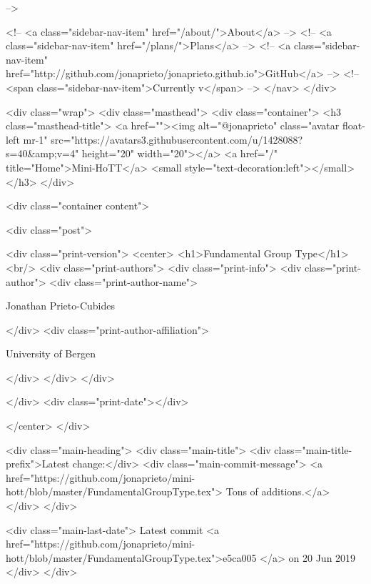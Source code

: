       
     -->

    <!-- <a class="sidebar-nav-item" href="/about/">About</a> -->
    <!-- <a class="sidebar-nav-item" href="/plans/">Plans</a> -->
    <!-- <a class="sidebar-nav-item" href="http://github.com/jonaprieto/jonaprieto.github.io">GitHub</a> -->
    <!-- <span class="sidebar-nav-item">Currently v</span> -->
  </nav>
</div>

    <div class="wrap">
      <div class="masthead">
        <div class="container">
          <h3 class="masthead-title">
            <a href=""><img alt="@jonaprieto" class="avatar float-left mr-1" src="https://avatars3.githubusercontent.com/u/1428088?s=40&amp;v=4" height="20" width="20"></a>
            <a href="/" title="Home">Mini-HoTT</a>
            <small style="text-decoration:left"></small>
          </h3>
        </div>
      
      <div class="container content">
        







<div class="post">

  <div class="print-version">
    <center>
      <h1>Fundamental Group Type</h1><br/>
        <div class="print-authors">
          <div class="print-info">
            <div class="print-author">
              <div class="print-author-name">
                
                  Jonathan Prieto-Cubides
                
              </div>
              <div class="print-author-affiliation">
                
                  University of Bergen
                
                </div>
            </div>
          </div>
          
          
        </div>
        <div class="print-date"></div>
        
        
    </center>
  </div>

  
  <div class="main-heading">
    <div class="main-title">
      <div class="main-title-prefix">Latest change:</div>
      <div class="main-commit-message">
            <a href="https://github.com/jonaprieto/mini-hott/blob/master/FundamentalGroupType.tex">
              Tons of additions.</a>
      </div>
    </div>

    <div class="main-last-date">
      Latest commit <a href="https://github.com/jonaprieto/mini-hott/blob/master/FundamentalGroupType.tex">e5ca005 </a> on  20 Jun 2019
    </div>
  </div>
  

